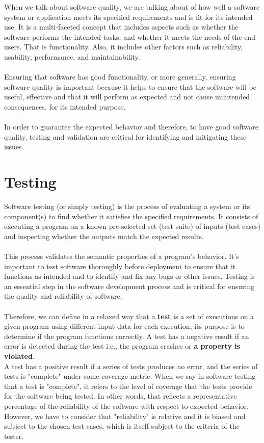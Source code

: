 \documentclass{report}
\begin{document}
When we talk about software quality, we are talking about of how well a software system or application meets its specified requirements and is fit for its intended use. It is a multi-faceted concept that includes aspects such as whether the software performs the intended tasks, and whether it meets the needs of the end users. That is functionality. Also, it includes other factors such as reliability, usability, performance, and maintainability.\\\\
Ensuring that software has good functionality, or more generally, ensuring software quality is important because it helps to ensure that the software will be useful, effective and that it will perform as expected and not cause unintended consequences. for its intended purpose.\\\\
In order to guarantee the expected behavior and therefore, to have good software quality, testing and validation are critical for identifying and mitigating these issues.

\section{Testing}

Software testing (or simply testing) is the process of evaluating a system or its component(s) to find whether it satisfies the specified requirements. It consists of executing a program on a known pre-selected set (test suite) of inputs (test cases) and inspecting whether the outputs match the expected results.\\\\
This process validates the semantic properties of a program's behavior. It's important to test software thoroughly before deployment to ensure that it functions as intended and to identify and fix any bugs or other issues. Testing is an essential step in the software development process and is critical for ensuring the quality and reliability of software.\\\\
Therefore, we can define in a relaxed way that a \textbf{test} is a set of executions on a given program using different input data for each execution; its purpose is to determine if the program functions correctly. A test has a negative result if an error is detected during the test i.e., the program crashes or \textbf{a property is violated}. \\

A test has a positive result if a series of tests produces no error, and the series of tests is "complete" under some coverage metric. When we say in software testing that a test is "complete", it refers to the level of coverage that the tests provide for the software being tested. In other words, that reflects a representative percentage of the reliability of the software with respect to expected behavior. However, we have to consider that "reliability" is relative and it is biased and subject to the chosen test cases, which is itself subject to the criteria of the tester.\\
\end{document}
